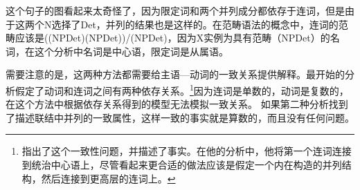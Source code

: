 这个句子的图看起来太奇怪了，因为限定词和两个并列成分都依存于连词，但是由于这两个N选择了Det，并列的结果也是这样的。在范畴语法的概念中，连词的范畴应该是((NP\bs Det)\bs (NP\bs Det))/(NP\bs Det)，因为X实例为具有范畴（NP\bs Det）的名词，在这个分析中名词是中心语，限定词是从属语。

需要注意的是，这两种方法都需要给主语—动词的一致关系提供解释。\tes 最开始的分析假定了动词和连词之间有两种依存关系。\footnote{%
 \citet[]{Eroms2000a}指出了这个一致性问题，并描述了事实。在他的分析中，他将第一个连词连接到统治中心语上，尽管看起来更合适的做法应该是假定一个内在构造的并列结构，然后连接到更高层的连词上。
}因为连词是单数的，动词是复数的，在这个方法中根据依存关系得到的模型无法模拟一致关系。
如果第二种分析找到了描述联结中并列的一致属性，这样一致的事实就是算数的，而且没有任何问题。

